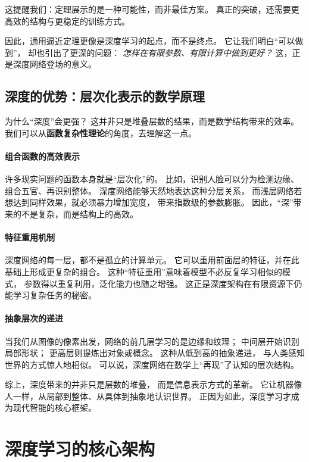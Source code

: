 这提醒我们：定理展示的是一种可能性，而非最佳方案。  
真正的突破，还需要更高效的结构与更稳定的训练方式。

因此，通用逼近定理更像是深度学习的起点，而不是终点。  
它让我们明白“可以做到”，  
却也引出了更深的问题：  
\textit{怎样在有限参数、有限计算中做到更好？}  
这，正是深度网络登场的意义。

\subsection{深度的优势：层次化表示的数学原理}

为什么“深度”会更强？  
这并非只是堆叠层数的结果，而是数学结构带来的效率。  
我们可以从\textbf{函数复杂性理论}的角度，去理解这一点。

\paragraph{组合函数的高效表示}  
许多现实问题的函数本身就是“层次化”的。  
比如，识别人脸可以分为检测边缘、组合五官、再识别整体。  
深度网络能够天然地表达这种分层关系，  
而浅层网络若想达到同样效果，就必须暴力增加宽度，  
带来指数级的参数膨胀。  
因此，“深”带来的不是复杂，而是结构上的高效。  

\paragraph{特征重用机制}  
深度网络的每一层，都不是孤立的计算单元。  
它可以重用前面层的特征，并在此基础上形成更复杂的组合。  
这种“特征重用”意味着模型不必反复学习相似的模式，  
参数得以重复利用，泛化能力也随之增强。  
这正是深度架构在有限资源下仍能学习复杂任务的秘密。  

\paragraph{抽象层次的递进}  
当我们从图像的像素出发，网络的前几层学习的是边缘和纹理；  
中间层开始识别局部形状；  
更高层则提炼出对象或概念。  
这种从低到高的抽象递进，  
与人类感知世界的方式惊人地相似。  
可以说，深度网络在数学上“再现”了认知的层次结构。  

综上，深度带来的并非只是层数的堆叠，  
而是信息表示方式的革新。  
它让机器像人一样，从局部到整体、从具体到抽象地认识世界。  
正因为如此，深度学习才成为现代智能的核心框架。

\section{深度学习的核心架构}

